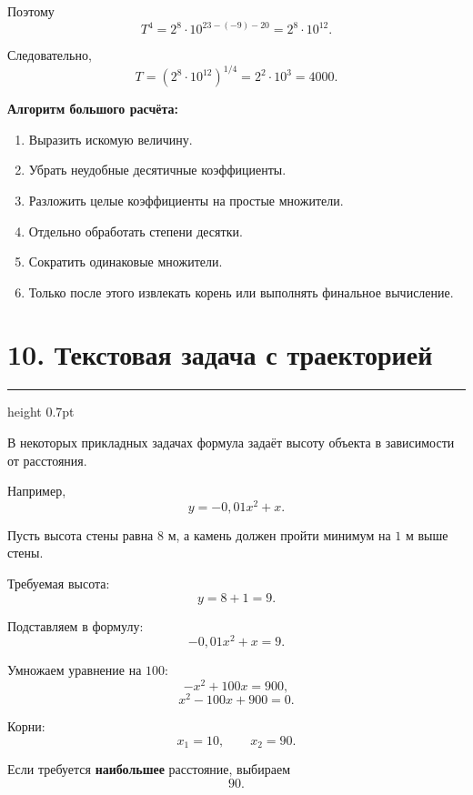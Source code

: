 \documentclass[a4paper,12pt]{article}
\newcommand{\sectionline}{%
    \par\vspace{0.15em}
    {\color{lightaccent}\hrule height 0.7pt}
    \vspace{0.7em}
}
\newcommand{\key}[1]{\textcolor{darkaccent}{\textbf{#1}}}
\begin{document}
Поэтому
\[
T^4
=
2^8\cdot10^{23-(-9)-20}
=
2^8\cdot10^{12}.
\]

Следовательно,
\[
T=
\left(2^8\cdot10^{12}\right)^{1/4}
=
2^2\cdot10^3
=
\boxed{4000}.
\]

\key{Алгоритм большого расчёта:}

\begin{enumerate}
    \item Выразить искомую величину.
    \item Убрать неудобные десятичные коэффициенты.
    \item Разложить целые коэффициенты на простые множители.
    \item Отдельно обработать степени десятки.
    \item Сократить одинаковые множители.
    \item Только после этого извлекать корень или выполнять финальное вычисление.
\end{enumerate}


\newpage

\section*{\textcolor{darkaccent}{10. Текстовая задача с траекторией}}

\sectionline

В некоторых прикладных задачах формула задаёт высоту объекта в зависимости
от расстояния.

Например,
\[
y=-0,01x^2+x.
\]

Пусть высота стены равна \(8\) м, а камень должен пройти минимум на \(1\) м
выше стены.

Требуемая высота:
\[
y=8+1=9.
\]

Подставляем в формулу:
\[
-0,01x^2+x=9.
\]

Умножаем уравнение на \(100\):
\[
-x^2+100x=900,
\]
\[
x^2-100x+900=0.
\]

Корни:
\[
x_1=10,
\qquad
x_2=90.
\]

Если требуется \textbf{наибольшее} расстояние, выбираем
\[
\boxed{90}.
\]
\end{document}
